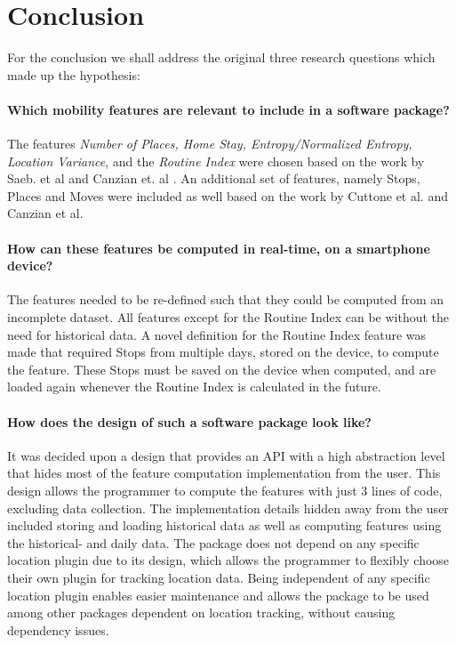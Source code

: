 \chapter{Conclusion}
\label{chapter:08}

For the conclusion we shall address the original three research questions which made up the hypothesis:

\subsubsection*{Which mobility features are relevant to include in a software package?}
The features \textit{Number of Places, Home Stay, Entropy/Normalized Entropy, Location Variance}, and the \textit{Routine Index} were chosen based on the work by Saeb. et al \cite{Saeb2015} and Canzian et. al \cite{Canzian2015}. An additional set of features, namely Stops, Places and Moves were included as well based on the work by Cuttone et al. \cite{sparse-location-2014} and Canzian et al. 

\subsubsection*{How can these features be computed in real-time, on a smartphone device?}
The features needed to be re-defined such that they could be computed from an incomplete dataset. All features except for the Routine Index can be without the need for historical data. A novel definition for the Routine Index feature was made that required Stops from multiple days, stored on the device, to compute the feature. These Stops must be saved on the device when computed, and are loaded again whenever the Routine Index is calculated in the future.

\subsubsection*{How does the design of such a software package look like?}
It was decided upon a design that provides an API with a high abstraction level that hides most of the feature computation implementation from the user. This design allows the programmer to compute the features with just 3 lines of code, excluding data collection. The implementation details hidden away from the user included storing and loading historical data as well as computing features using the historical- and daily data. The package does not depend on any specific location plugin due to its design, which allows the programmer to flexibly choose their own plugin for tracking location data. Being independent of any specific location plugin enables easier maintenance and allows the package to be used among other packages dependent on location tracking, without causing dependency issues. 

